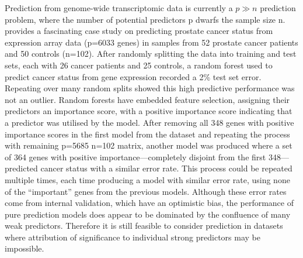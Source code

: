 Prediction from genome-wide transcriptomic data is currently a $p \gg n$ prediction problem,
where the number of potential predictors p dwarfs the sample size n.
\textcite{efron2020PredictionEstimationAttribution} provides a fascinating case study on predicting prostate cancer status from expression array data (p=6033 genes) in 
samples from 52 prostate cancer patients and 50 controls (n=102).
After randomly splitting the data into training and test sets, each with 26 cancer patients and 25 controls,
a random forest used to predict cancer status from gene expression recorded a 2\% test set error.
Repeating over many random splits showed this high predictive performance was not an outlier.
Random forests have embedded feature selection, assigning their predictors an importance score, 
with a positive importance score indicating that a predictor was utilised by the model.
After removing all 348 genes with positive importance scores in the first model from the dataset and repeating the process with remaining p=5685 n=102 matrix,
another model was produced where a set of 364 genes with positive importance---completely disjoint from the first 348---predicted cancer status with a similar error rate.
This process could be repeated multiple times, each time producing a model with similar error rate, using none of the \enquote{important} genes from the previous models.
Although these error rates come from internal validation, which have an optimistic bias,
the performance of pure prediction models does appear to be dominated by the confluence of many weak predictors.
Therefore it is still feasible to consider prediction in datasets where attribution of significance to individual strong predictors may be impossible.

